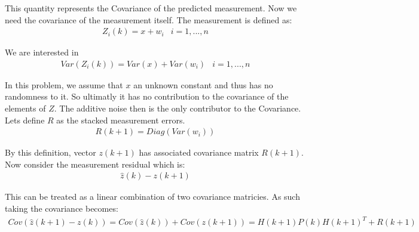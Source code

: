 \documentclass{article}
\begin{document}
This quantity represents the Covariance of the predicted measurement. Now we need the covariance of the measurement itself. The measurement is defined as:
\begin{align*}
Z_i(k) = x + w_i & i = 1,...,n
\end{align*}

We are interested in
\begin{align*}
Var(Z_i(k)) = Var(x) + Var(w_i) & i = 1,...,n
\end{align*}

In this problem, we assume that $x$ an unknown constant and thus has no randomness to it. So ultimatly it has no contribution to the covariance of the elements of $Z$. The additive noise then is the only contributor to the Covariance. Lets define $R$ as the stacked measurement errors.
\begin{align*}
R(k+1) = Diag(Var(w_i))
\end{align*}

By this definition, vector $z(k+1)$ has associated covariance matrix $R(k+1)$. Now consider the measurement residual which is:
\begin{align*}
\hat{z}(k)-z(k+1)
\end{align*}

This can be treated as a linear combination of two covariance matricies. As such taking the covariance becomes:
\begin{align*}
\boxed{ Cov(\hat{z}(k+1)-z(k)) = Cov(\hat{z}(k)) + Cov(z(k+1)) = H(k+1) P(k) H(k+1)^T + R(k+1) }
\end{align*}





\end{document}
